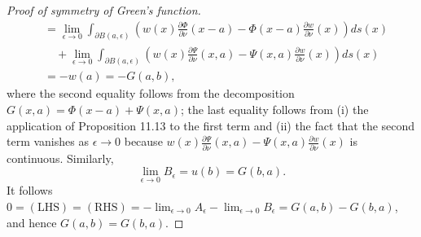 \begin{proof}[Proof of symmetry of Green's function]
\begin{align*}
        &= \lim_{\epsilon \to 0} \int_{\partial B(a, \epsilon)} \left(w(x)\frac{\partial\Phi}{\partial\nu}(x - a) - \Phi(x - a)\frac{\partial w}{\partial\nu}(x)\right) ds(x) \\
        &\quad + \lim_{\epsilon \to 0} \int_{\partial B(a, \epsilon)} \left(w(x)\frac{\partial\Psi}{\partial\nu}(x, a) - \Psi(x, a)\frac{\partial w}{\partial\nu}(x)\right) ds(x) \\
        &= -w(a) = -G(a, b),
    \end{align*}
    where the second equality follows from the decomposition $G(x, a) = \Phi(x - a) + \Psi(x, a)$; the last equality follows from (i) the application of Proposition 11.13 to the first term and (ii) the fact that the second term vanishes as $\epsilon \to 0$ because $w(x)\frac{\partial\Psi}{\partial\nu}(x, a) - \Psi(x, a)\frac{\partial w}{\partial\nu}(x)$ is continuous. Similarly,
    \[\lim_{\epsilon \to 0} B_\epsilon = u(b) = G(b, a).\]
    It follows $0 = (\text{LHS}) = (\text{RHS}) = -\lim_{\epsilon \to 0} A_\epsilon - \lim_{\epsilon \to 0} B_\epsilon = G(a, b) - G(b, a)$, and hence $G(a, b) = G(b, a)$.
\end{proof}

